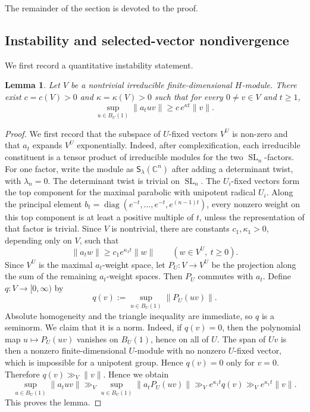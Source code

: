 \documentclass[reqno,11pt]{amsart}
\numberwithin{equation}{section}
\newtheorem{lemma}[theorem]{Lemma}
\theoremstyle{definition}
\theoremstyle{remark}
\newcommand{\op}{\operatorname}
\newcommand{\SL}{\op{SL}}
\begin{document}
The remainder of the section is devoted to the proof.

\subsection{Instability and selected-vector nondivergence}
We first record a quantitative instability statement. 

\begin{lemma}\label{lem:liegroupinstability}
Let $V$ be a nontrivial irreducible finite-dimensional $H$-module. There
exist  $c=c(V)>0$ and $\kappa=\kappa(V)>0$ such that
for every $0\ne v\in V$ and $t\ge1$,
$$
\sup_{u\in B_{U}(1)}\|a_tuv\|
\ge c\,  e^{\kappa t}\|v\|.
$$
\end{lemma}

\begin{proof}
 We first record that the subspace of $U$-fixed vectors
$V^{U}$ is non-zero and that $a_t$ expands $V^{U}$ exponentially. Indeed,
after complexification, each irreducible constituent is a tensor product of
irreducible modules for the two $\SL_n$-factors. For one factor, write the
module as ${\mathsf S}_\lambda(\mathbb C^n)$ after adding a determinant
twist, with $\lambda_n=0$. The determinant twist is trivial on $\SL_n$.
The $U_i$-fixed vectors form the top component for the maximal parabolic
with unipotent radical $U_i$. Along the principal element
$b_t=\operatorname{diag}(e^{-t},\ldots,e^{-t},e^{(n-1)t})$, every nonzero
weight on this top component is at least a positive multiple of $t$, unless
the representation of that factor is trivial. Since $V$ is nontrivial,
there are constants $c_1,\kappa_1>0$, depending only on $V$, such that
\begin{equation}\label{eq:UH-fixed-expansion}
\|a_tw\|
\ge c_1e^{\kappa_1t}\|w\|
\qquad
(w\in V^{U},\ t\ge0).
\end{equation}
Since $V^U$ is the maximal $a_t$-weight space, let
$P_U:V\to V^U$ be the projection along the sum of the remaining
$a_t$-weight spaces. Then $P_U$ commutes with $a_t$.
Define $q:V\to[0,\infty)$ by
$$
q(v):=\sup_{u\in B_U(1)}\|P_U(uv)\|.
$$
Absolute homogeneity and the triangle inequality are immediate, so $q$
is a seminorm. We claim that it is a norm. Indeed, if $q(v)=0$, then the polynomial map
$u\mapsto P_{U}(uv)$ vanishes on $B_{U}(1)$, hence on all of $U$. The span
of $Uv$ is then a nonzero finite-dimensional $U$-module with no nonzero
$U$-fixed vector, which is impossible for a unipotent group. Hence
$q(v)=0$ only for $v=0$. Therefore
$q(v)\gg_V\|v\|$. Hence we obtain
$$
\sup_{u\in B_{U}(1)}\|a_tuv\|
\gg_V
\sup_{u\in B_{U}(1)}\|a_tP_{U}(uv)\|
\gg_V e^{\kappa_1t}q(v)
\gg_V e^{\kappa_1t}\|v\|.
$$
This proves the lemma.
\end{proof}
\end{document}
